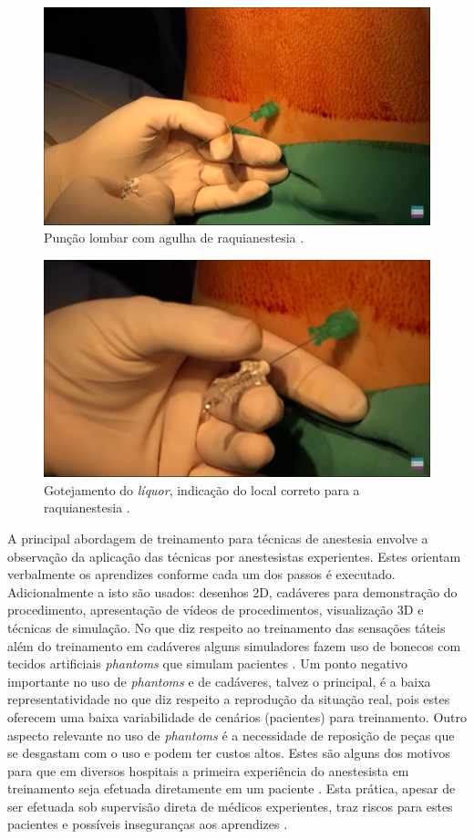 \begin{figure}[!ht]
   \centering
   \includegraphics[width=0.6\linewidth]{capitulos/figuras/2.PuncaoLombar.png}
   \caption{Punção lombar com agulha de raquianestesia  \cite{Londero2018}.}
   \label{fig:puncaoLombar}
\end{figure}

\begin{figure}[!ht]
   \centering
   \includegraphics[width=0.6\linewidth]{capitulos/figuras/3.GotejamentoLiquor.png}
   \caption{Gotejamento do \textit{líquor}, indicação do local correto para a raquianestesia \cite{Londero2018}.}
   \label{fig:gotejamentoLiquor}
\end{figure}

A principal abordagem de treinamento para técnicas de anestesia envolve a observação da aplicação das técnicas por anestesistas experientes. Estes orientam verbalmente os aprendizes conforme cada um dos passos é executado. Adicionalmente a isto são usados: desenhos 2D, cadáveres para demonstração do procedimento, apresentação de vídeos de procedimentos, visualização 3D e técnicas de simulação. No que diz respeito ao treinamento das sensações táteis além do treinamento em cadáveres alguns simuladores fazem uso de bonecos com tecidos artificiais \textit{phantoms} que simulam pacientes \cite{Dreifaldt2006}. Um ponto negativo importante no uso de \textit{phantoms} e de cadáveres, talvez o principal, é a baixa representatividade no que diz respeito a reprodução da situação real, pois estes oferecem uma baixa variabilidade de cenários (pacientes) para treinamento.  Outro aspecto relevante no uso de \textit{phantoms} é a necessidade de reposição de peças que se desgastam com o uso e podem ter custos altos. Estes são alguns dos motivos para que em diversos hospitais a primeira experiência do anestesista em treinamento seja efetuada diretamente em um paciente \cite{Aggarwal2009, Grantcharov2008, Smith2005, Watterson2007}. Esta prática, apesar de ser efetuada sob supervisão direta de médicos experientes, traz riscos para estes pacientes e possíveis inseguranças aos aprendizes \cite{Elmofty2017}. 

